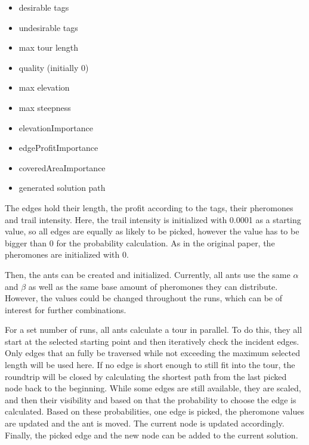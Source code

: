\begin{minipage}[t][2cm][b]{0.3\textwidth}
	\begin{itemize}
		\item desirable tags
		\item undesirable tags
		\item max tour length
	
	\end{itemize}
\end{minipage}
\begin{minipage}[t][2cm][b]{0.3\textwidth}
	\begin{itemize}
		\item quality (initially 0)
		\item max elevation
		\item max steepness
	\end{itemize}	
\end{minipage}
\begin{minipage}[t][2.9cm][b]{0.33\textwidth}
	\begin{itemize}
		\item elevationImportance
		\item edgeProfitImportance
		\item coveredAreaImportance
		\item generated solution path
	\end{itemize}	
\end{minipage}

\vspace{1cm}
The edges hold their length, the profit according to the tags, their pheromones and trail intensity. 
Here, the trail intensity is initialized with 0.0001 as a starting value, so all edges are equally as likely to be picked, however the value has to be bigger than 0 for the probability calculation.
As in the original paper, the pheromones are initialized with 0.

Then, the ants can be created and initialized. 
Currently, all ants use the same $\alpha$ and $\beta$ as well as the same base amount of pheromones they can distribute.
However, the values could be changed throughout the runs, which can be of interest for further combinations.

For a set number of runs, all ants calculate a tour in parallel. 
To do this, they all start at the selected starting point and then iteratively check the incident edges.
Only edges that an fully be traversed while not exceeding the maximum selected length will be used here.
If no edge is short enough to still fit into the tour, the roundtrip will be closed by calculating the shortest path from the last picked node back to the beginning.
While some edges are still available, they are scaled, and then their visibility and based on that the probability to choose the edge is calculated. 
Based on these probabilities, one edge is picked, the pheromone values are updated and the ant is moved.
The current node is updated accordingly. 
Finally, the picked edge and the new node can be added to the current solution.

